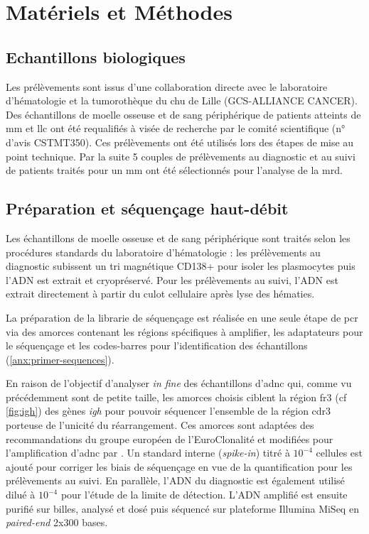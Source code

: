 \chapter{Matériels et Méthodes}

\section{Echantillons biologiques}

Les prélèvements sont issus d'une collaboration directe avec le laboratoire d'hématologie et la tumorothèque du 
\gls{chu} de Lille (GCS-ALLIANCE CANCER). Des échantillons de moelle osseuse et de sang périphérique de patients 
atteints de \gls{mm} et \gls{llc} ont été requalifiés à visée de recherche par le comité scientifique (n° d'avis CSTMT350). 
Ces prélèvements ont été utilisés lors des étapes de mise au point technique. Par la suite 5 couples de prélèvements 
au diagnostic et au suivi de patients traités pour un \gls{mm} ont été sélectionnés pour l'analyse de la \gls{mrd}.

\section{Préparation et séquençage haut-débit}

Les échantillons de moelle osseuse et de sang périphérique sont traités selon les procédures standards du laboratoire 
d'hématologie : les prélèvements au diagnostic subissent un tri magnétique CD138+ pour isoler les plasmocytes puis l'ADN 
est extrait et cryopréservé. Pour les prélèvements au suivi, l'ADN est extrait directement à partir du culot cellulaire 
après lyse des hématies.

\vspace{1em}

La préparation de la librarie de séquençage est réalisée en une seule étape de \gls{pcr} via des amorces contenant les 
régions spécifiques à amplifier, les adaptateurs pour le séquençage et les codes-barres pour l'identification des échantillons 
(\autoref{anx:primer-sequences}).

\vspace{1em}

En raison de l'objectif d'analyser \textit{in fine} des échantillons d'\gls{adnc} qui, comme vu précédemment sont de petite taille, 
les amorces choisis ciblent la région \gls{fr}3 (cf \autoref{fig:igh}) des gènes \textit{\gls{igh}} pour pouvoir séquencer l'ensemble de la 
région \gls{cdr}3 porteuse de l'unicité du réarrangement. 
Ces amorces sont adaptées des recommandations du groupe européen de l'EuroClonalité \cite{langerakEuroClonalityBIOMED2Guidelines2012} 
et modifiées pour l'amplification d'\gls{adnc} par \citeauthor{pottCfDNABasedNGSIG2022a} \cite{pottCfDNABasedNGSIG2022a}.
Un standard interne (\textit{spike-in}) titré à $10^{-4}$ cellules est ajouté pour corriger les biais de séquençage en vue de la quantification 
pour les prélèvements au suivi. En parallèle, l'ADN du diagnostic est également utilisé dilué à $10^{-4}$ pour l'étude de la limite de détection. 
L'ADN amplifié est ensuite purifié sur billes, analysé et dosé puis séquencé sur plateforme Illumina MiSeq en \textit{paired-end} 2x300 bases.

